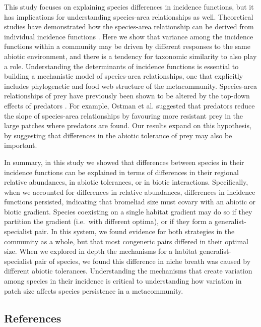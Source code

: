 This study focuses on explaining species differences in incidence
functions, but it has implications for understanding species-area
relationships as well. Theoretical studies have demonstrated how the
species-area relationship can be derived from individual incidence
functions \citep{Ovaskainen2003}. Here we show that variance among the
incidence functions within a community may be driven by different
responses to the same abiotic environment, and there is a tendency for
taxonomic similarity to also play a role. Understanding the determinants
of incidence functions is essential to building a mechanistic model of
species-area relationships, one that explicitly includes phylogenetic
and food web structure of the metacommunity. Species-area relationships
of prey have previously been shown to be altered by the top-down effects
of predators \citep{Ryberg2007}. For example, Ostman et al.
\citeyearpar{Ostman2007} suggested that predators reduce the slope of
species-area relationships by favouring more resistant prey in the large
patches where predators are found. Our results expand on this
hypothesis, by suggesting that differences in the abiotic tolerance of
prey may also be important.

In summary, in this study we showed that differences between species in
their incidence functions can be explained in terms of differences in
their regional relative abundances, in abiotic tolerances, or in biotic
interactions. Specifically, when we accounted for differences in
relative abundances, differences in incidence functions persisted,
indicating that bromeliad size must covary with an abiotic or biotic
gradient. Species coexisting on a single habitat gradient may do so if
they partition the gradient (i.e.~with different optima), or if they
form a generalist-specialist pair. In this system, we found evidence for
both strategies in the community as a whole, but that most congeneric
pairs differed in their optimal size. When we explored in depth the
mechanisms for a habitat generalist-specialist pair of species, we found
this difference in niche breath was caused by different abiotic
tolerances. Understanding the mechanisms that create variation among
species in their incidence is critical to understanding how variation in
patch size affects species persistence in a metacommunity.

\subsection{References}\label{references}
